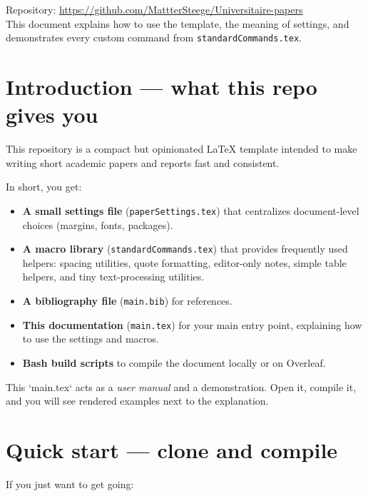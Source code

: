 \documentclass[nonacm, sigconf, balance=true]{acmart}
\begin{document}
    \begin{center}
        \small
        Repository: \url{https://github.com/MattterSteege/Universitaire-papers} \\
        This document explains how to use the template, the meaning of settings,
        and demonstrates every custom command from \texttt{standardCommands.tex}.
    \end{center}

    \vmed
    \clearpage

    \onecolumn



    \section{Introduction — what this repo gives you}
    This repository is a compact but opinionated LaTeX template intended to make writing short academic papers and reports fast and consistent.

    In short, you get:
    \begin{itemize}
        \item \textbf{A small settings file} (\texttt{paperSettings.tex}) that centralizes document-level choices (margins, fonts, packages).
        \item \textbf{A macro library} (\texttt{standardCommands.tex}) that provides frequently used helpers: spacing utilities, quote formatting, editor-only notes, simple table helpers, and tiny text-processing utilities.
        \item \textbf{A bibliography file} (\texttt{main.bib}) for references.
        \item \textbf{This documentation} (\texttt{main.tex}) for your main entry point, explaining how to use the settings and macros.
        \vmed
        \item \textbf{Bash build scripts} to compile the document locally or on Overleaf.
    \end{itemize}

    This `main.tex` acts as a \emph{user manual} and a demonstration. Open it, compile it, and you will see rendered examples next to the explanation.



    \section{Quick start — clone and compile}
    If you just want to get going:
\end{document}
